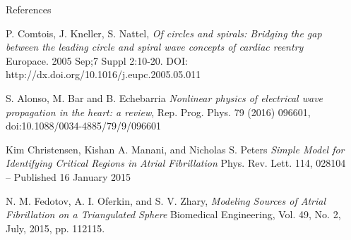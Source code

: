 \documentclass[final,hyperref={pdfpagelabels=false}]{beamer}
\begin{document}
\begin{frame}[t]
\begin{columns}[t]
\begin{column}{.465\textwidth}
\begin{block}{References}
\begin{thebibliography}{1}

\small
{}
P. Comtois, J. Kneller, S. Nattel,
\emph{Of circles and spirals: Bridging the gap between the leading circle and spiral wave concepts of cardiac reentry}
Europace. 2005 Sep;7 Suppl 2:10-20.
DOI: http://dx.doi.org/10.1016/j.eupc.2005.05.011



S. Alonso, M. Bar and B. Echebarria
\emph{Nonlinear physics of electrical wave
propagation in the heart: a review},
Rep. Prog. Phys. 79 (2016) 096601, 
doi:10.1088/0034-4885/79/9/096601

Kim Christensen, Kishan A. Manani, and Nicholas S. Peters
\emph{Simple Model for Identifying Critical Regions in Atrial Fibrillation}
Phys. Rev. Lett. 114, 028104 – Published 16 January 2015



N. M. Fedotov,  A. I. Oferkin, and S. V. Zhary,
\emph{Modeling Sources of Atrial Fibrillation on a Triangulated Sphere}
Biomedical Engineering, Vol. 49, No. 2, July, 2015, pp. 112115. 
\end{thebibliography}

\end{block}









\end{column} %

\begin{column}{.015\textwidth}\end{column} %

\end{columns} %

\end{frame} %
\end{document}
